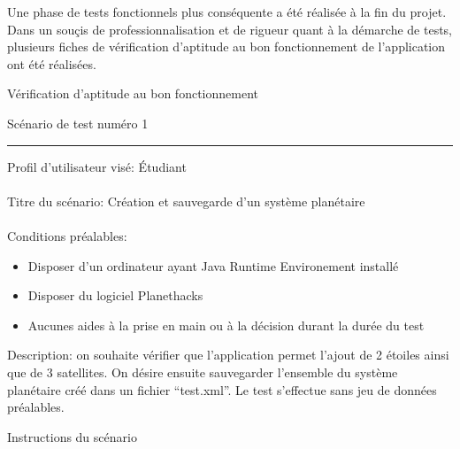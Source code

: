 \documentclass[a4paper,10pt]{article}
\begin{document}
Une phase de tests fonctionnels plus conséquente a été réalisée à la fin du projet. Dans un souçis de professionnalisation et de rigueur quant à
la démarche de tests, plusieurs fiches de vérification d'aptitude au bon fonctionnement de l'application ont été réalisées.


\newpage
{}
\begin{center}
  \begin{huge}
    Vérification d'aptitude au bon fonctionnement \\
  \end{huge}
  \vspace{1cm}
  \begin{Large}
    Scénario de test numéro 1
  \end{Large}
\end{center}
\rule{\linewidth}{.5pt}
Profil d'utilisateur visé: Étudiant \\\\
Titre du scénario: Création et sauvegarde d'un système planétaire \\\\
Conditions préalables:
\begin{itemize}
 \item Disposer d'un ordinateur ayant Java Runtime Environement installé
 \item Disposer du logiciel Planethacks
 \item Aucunes aides à la prise en main ou à la décision durant la durée du test
\end{itemize}
Description: on souhaite vérifier que l'application permet l'ajout de 2 étoiles ainsi que de 3 satellites. 
On désire ensuite sauvegarder l'ensemble du système planétaire créé dans un fichier ``test.xml''.
Le test s'effectue sans jeu de données préalables.
\begin{center}
 \begin{Large}
    Instructions du scénario
  \end{Large}
\end{center}
\end{document}
